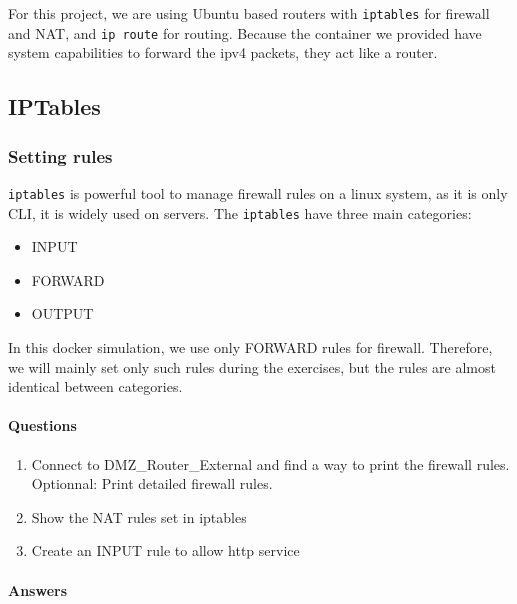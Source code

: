 \documentclass[a4paper,11pt,singlespacing]{article}
\providecommand{\tightlist}{%
  \setlength{\itemsep}{0pt}\setlength{\parskip}{0pt}}
\begin{document}
For this project, we are using Ubuntu based routers with
\texttt{iptables} for firewall and NAT, and \texttt{ip\ route} for
routing. Because the container we provided have system capabilities to
forward the ipv4 packets, they act like a router.

\subsection{IPTables}\label{iptables}

\subsubsection{Setting rules}\label{setting-rules}

\texttt{iptables} is powerful tool to manage firewall rules on a linux
system, as it is only CLI, it is widely used on servers. The
\texttt{iptables} have three main categories:

\begin{itemize}
\tightlist
\item
  INPUT
\item
  FORWARD
\item
  OUTPUT
\end{itemize}

In this docker simulation, we use only FORWARD rules for firewall.
Therefore, we will mainly set only such rules during the exercises, but
the rules are almost identical between categories.

\paragraph{Questions}\label{questions}

\begin{enumerate}
\def\labelenumi{\arabic{enumi}.}
\tightlist
\item
  Connect to DMZ\_Router\_External and find a way to print the firewall
  rules. Optionnal: Print detailed firewall rules.
\item
  Show the NAT rules set in iptables
\item
  Create an INPUT rule to allow http service
\end{enumerate}

\newpage

\paragraph{Answers}\label{answers}
\end{document}
